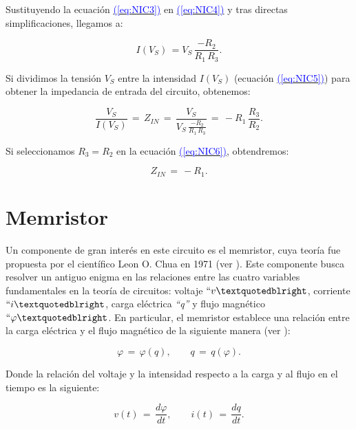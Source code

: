 \documentclass[12pt,a4paper]{report} %
\newcommand{\eref}[1]{\hyperref[#1]{\textcolor{blue}{(\ref*{#1})}}}
\newcommand{\eref}[1]{\hyperref[#1]{\textcolor{blue}{\textit{(\ref*{#1})}}}}
\begin{document}
	\noindent Sustituyendo la ecuación \eref{eq:NIC3} en \eref{eq:NIC4} y tras directas simplificaciones, llegamos a:
	
	\begin{equation}
		I(V_S)\,=V_S\,\frac{-R_2}{R_1 \, R_3}.
		\label{eq:NIC5}
	\end{equation}\smallskip
	
	\noindent Si dividimos la tensión $V_S$ entre la intensidad $I(V_S)$ (ecuación \eref{eq:NIC5}) para obtener la impedancia de entrada del circuito, obtenemos:
	
	\begin{equation}
		\frac{V_S}{I(V_S)}\,=\,Z_{IN}\,=\,\frac{V_S}{V_S\,\frac{-R_2}{R_1 \, R_3}}\,=\,-R_1\,\frac{R_3}{R_2}.
		\label{eq:NIC6}
	\end{equation}\smallskip
	
	\noindent Si seleccionamos $R_3 = R_2$ en la ecuación \eref{eq:NIC6}, obtendremos:
	
	\begin{equation}
		Z_{IN}\,=\,-R_1.
		\label{eq:NIC7}
	\end{equation}\smallskip
	
	\newpage
	
	\section{Memristor}
	
	 Un componente de gran interés en este circuito es el memristor, cuya teoría fue propuesta por el científico Leon O. Chua en 1971 (ver \cite{chuamissing1971}). Este componente busca resolver un antiguo enigma en las relaciones entre las cuatro variables fundamentales en la teoría de circuitos: voltaje $`` v \textquotedblright$, corriente $`` i \textquotedblright$, carga eléctrica \textit{``q''} y flujo magnético $``\varphi\textquotedblright$. En particular, el memristor establece una relación entre la carga eléctrica y el flujo magnético de la siguiente manera (ver \cite{chuaoscillator2008}):
	
	\begin{equation}
		\varphi\,=\,\varphi(q), \qquad q\,=\,q(\varphi).
		\label{eq:flujocarga}
	\end{equation}\smallskip
	
	\noindent Donde la relación del voltaje y la intensidad respecto a la carga y al flujo en el tiempo es la siguiente:
	
	\begin{equation}
		v(t)\,=\,\frac{d\varphi}{dt}, \qquad i(t)\,=\,\frac{dq}{dt}.
		\label{eq:dvdi}
	\end{equation}
			
\end{document}
